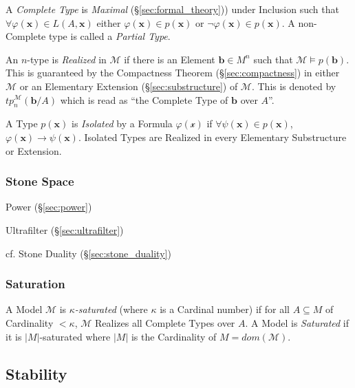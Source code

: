 A \emph{Complete Type} is \emph{Maximal} (\S\ref{sec:formal_theory}))
under Inclusion such that $\forall \varphi(\mathbf{x}) \in
L(A,\mathbf{x})$ either $\varphi(\mathbf{x}) \in p(\mathbf{x})$ or
$\neg \varphi(\mathbf{x}) \in p(\mathbf{x})$. A non-Complete type is
called a \emph{Partial Type}.

An $n$-type is \emph{Realized} in $\mathcal{M}$ if there is an Element
$\mathbf{b} \in M^n$ such that $\mathcal{M} \models p(\mathbf{b})$.
This is guaranteed by the Compactness Theorem
(\S\ref{sec:compactness}) in either $\mathcal{M}$ or an Elementary
Extension (\S\ref{sec:substructure}) of $\mathcal{M}$. This is denoted
by $tp_{n}^{\mathcal{M}}(\mathbf{b}/A)$ which is read as ``the
Complete Type of $\mathbf{b}$ over $A$''.

A Type $p(\mathbf{x})$ is \emph{Isolated} by a Formula
$\varphi(\mathcal{x})$ if $\forall \psi(\mathbf{x}) \in
p(\mathbf{x})$, $\varphi (\mathbf{x}) \rightarrow
\psi(\mathbf{x})$. Isolated Types are Realized in every Elementary
Substructure or Extension.



\subsubsection{Stone Space}\label{sec:stone_space}

Power (\S\ref{sec:power})

Ultrafilter (\S\ref{sec:ultrafilter})

\fist cf. Stone Duality (\S\ref{sec:stone_duality})



\subsubsection{Saturation}\label{sec:model_saturation}

A Model $\mathcal{M}$ is \emph{$\kappa$-saturated} (where $\kappa$ is
a Cardinal number) if for all $A \subseteq M$ of Cardinality $<
\kappa$, $\mathcal{M}$ Realizes all Complete Types over $A$. A Model
is \emph{Saturated} if it is $|M|$-saturated where $|M|$ is the
Cardinality of $M = dom(\mathcal{M})$.



\subsection{Stability}\label{sec:model_stability}

